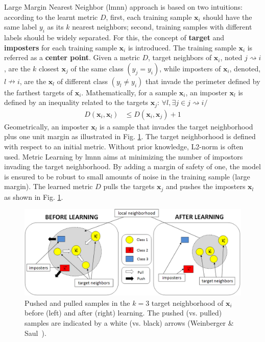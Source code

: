 Large Margin Nearest Neighbor ({\sc lmnn}) approach is based on two intuitions: according to the learnt metric $D$, first, each training sample $\textbf{x}_i$ should have the same label $y_i$ as its $k$ nearest neighbors; second, training samples with different labels should be widely separated. For this, the concept of \textbf{target} and \textbf{imposters} for each training sample $\textbf{x}_i$ is introduced. The training sample $\textbf{x}_i$ is referred as a \textbf{center point}. Given a metric $D$, target neighbors of $\textbf{x}_i$, noted $j \rightsquigarrow i$, are the $k$ closest $\textbf{x}_j$ of the same class $(y_j=y_i)$, while imposters of $\textbf{x}_i$, denoted, $l \nrightarrow i$, are the $\textbf{x}_l$ of different class $(y_l \neq y_i)$ that invade the perimeter defined by the farthest targets of $\textbf{x}_i$. 
Mathematically, for a sample $\textbf{x}_i$, an imposter $\textbf{x}_l$ is defined by an inequality related to the targets $\textbf{x}_j$: $\forall l, \exists j \in j \rightsquigarrow i /$
\begin{align}
D(\textbf{x}_i,\textbf{x}_l) &\leq D(\textbf{x}_i,\textbf{x}_j) + 1
\end{align}
Geometrically, an imposter $\textbf{x}_{l}$ is a sample that invades the target neighborhood plus one unit margin as illustrated in Fig. \ref{fig:TargetImposterRepresentation}. The target neighborhood is defined with respect to an initial metric. Without prior knowledge, L2-norm is often used. Metric Learning by {\sc lmnn} aims at minimizing the number of impostors invading the target neighborhood. By adding a margin of safety of one, the model is ensured to be robust to small amounts of noise in the training sample (large margin). The learned metric $D$ pulls the targets $\textbf{x}_j$ and pushes the imposters $\textbf{x}_{l}$ as shown in Fig. \ref{fig:TargetImposterRepresentation}.

\begin{figure}[h!]
	\centering
	\begin{minipage}[b]{0.85\linewidth}		
		\centerline{\includegraphics[width=0.8\linewidth]{./images/TargetImposterRepresentationCao}}
	\end{minipage}
	\caption{Pushed and pulled samples in the $k=3$ target neighborhood of $\textbf{x}_i$ before (left) and after (right) learning. The pushed (vs. pulled) samples are indicated by a white (vs. black) arrows (Weinberger \& Saul~\cite{Weinberger2009}).}
	\label{fig:TargetImposterRepresentation}
\end{figure}

